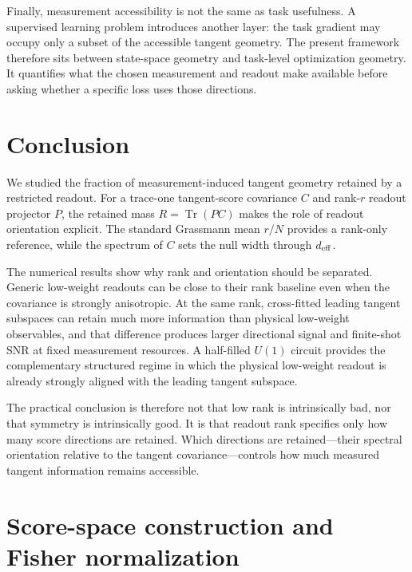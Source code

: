 \documentclass[aps,pra,reprint,superscriptaddress,nofootinbib,longbibliography]{revtex4-2}
\newcommand{\Tr}{\operatorname{Tr}}
\newcommand{\deff}{d_{\rm eff}}
\begin{document}
Finally, measurement accessibility is not the same as task usefulness. A supervised learning problem introduces another layer: the task gradient may occupy only a subset of the accessible tangent geometry. The present framework therefore sits between state-space geometry and task-level optimization geometry. It quantifies what the chosen measurement and readout make available before asking whether a specific loss uses those directions.

\section{Conclusion}

We studied the fraction of measurement-induced tangent geometry retained by a restricted readout. For a trace-one tangent-score covariance $C$ and rank-$r$ readout projector $P$, the retained mass $R=\Tr(PC)$ makes the role of readout orientation explicit. The standard Grassmann mean $r/N$ provides a rank-only reference, while the spectrum of $C$ sets the null width through $\deff$.

The numerical results show why rank and orientation should be separated. Generic low-weight readouts can be close to their rank baseline even when the covariance is strongly anisotropic. At the same rank, cross-fitted leading tangent subspaces can retain much more information than physical low-weight observables, and that difference produces larger directional signal and finite-shot SNR at fixed measurement resources. A half-filled $U(1)$ circuit provides the complementary structured regime in which the physical low-weight readout is already strongly aligned with the leading tangent subspace.

The practical conclusion is therefore not that low rank is intrinsically bad, nor that symmetry is intrinsically good. It is that readout rank specifies only how many score directions are retained. Which directions are retained---their spectral orientation relative to the tangent covariance---controls how much measured tangent information remains accessible.



\clearpage

\appendix

\section{Score-space construction and Fisher normalization}
\label{app:score_geometry}
\end{document}
